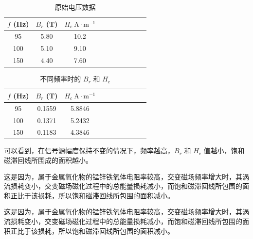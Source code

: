 \documentclass[UTF8]{article}
\theoremstyle{MyLineTheoremStyle} %
\theoremstyle{MyBlockTheoremStyle} %
\theoremstyle{MySubsubsectionStyle} %
\begin{document}
\begin{center}
    \noindent\begin{minipage}{0.49\columnwidth}
    \begin{table}[H]\centering
        \caption{原始电压数据}
    \begin{tabular}{cccccccccc}\toprule
        $f$ (Hz) & $B_r$ (T) & $H_c \ \mathrm{A\cdot m^{-1}}$  \\
        \midrule
        95  & 5.80 & 10.2  \\
        100 & 5.10 & 9.10  \\
        150 & 4.40 & 7.60 \\
        \bottomrule
    \end{tabular}
    \end{table}
\end{minipage}\begin{minipage}{0.49\columnwidth}
    \begin{table}[H]\centering
        \caption{不同频率时的 $B_r$ 和 $H_c$}
    \begin{tabular}{cccccccccc}\toprule
        $f$ (Hz) & $B_r$ (T) & $H_c \ \mathrm{A\cdot m^{-1}}$  \\
        \midrule
        95  & 0.1559 & 5.8846  \\
        100 & 0.1371 & 5.2432  \\
        150 & 0.1183 & 4.3846  \\
        \bottomrule
    \end{tabular}
    \end{table}
\end{minipage}
\end{center}


可以看到，在信号源幅度保持不变的情况下，频率越高，$B_r$ 和 $H_c$ 值越小，饱和磁滞回线所围成的面积越小。

这是因为，属于金属氧化物的锰锌铁氧体电阻率较高，交变磁场频率增大时，其涡流损耗变小，交变磁场磁化过程中的总能量损耗减小，而饱和磁滞回线所包围的面积正比于该损耗，所以饱和磁滞回线所包围的面积减小。

这是因为，属于金属氧化物的锰锌铁氧体电阻率较高，交变磁场频率增大时，其涡流损耗变小，交变磁场磁化过程中的总能量损耗减小，而饱和磁滞回线所包围的面积正比于该损耗，所以饱和磁滞回线所包围的面积减小。
\end{document}
